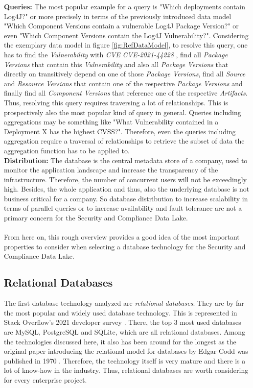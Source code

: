 \textbf{Queries:} The most popular example for a query is "Which deployments contain Log4J?" or more precisely in terms of the previously introduced data model "Which Component Versions contain a vulnerable Log4J Package Version?" or even "Which Component Versions contain the Log4J Vulnerability?". Considering the exemplary data model in figure \ref{fig:RefDataModel}, to resolve this query, one has to find the \emph{Vulnerability} with \emph{CVE} \textit{CVE-2021-44228} \cite{Log4jVuln}, find all \emph{Package Versions} that contain this \emph{Vulnerability} and also all \emph{Package Versions} that directly on transitively depend on one of those \emph{Package Versions}, find all \emph{Source} and \emph{Resource Versions} that contain one of the respective \emph{Package Versions} and finally find all \emph{Component Versions} that reference one of the respective \emph{Artifacts}. Thus, resolving this query requires traversing a lot of relationships. This is prospectively also the most popular kind of query in general. Queries including aggregations may be something like "What Vulnerability contained in a Deployment X has the highest CVSS?". Therefore, even the queries including aggregation require a traversal of relationships to retrieve the subset of data the aggregation function has to be applied to.\\
\textbf{Distribution:} The database is the central metadata store of a company, used to monitor the application landscape and increase the transparency of the infrastructure. Therefore, the number of concurrent users will not be exceedingly high. Besides, the whole application and thus, also the underlying database is not business critical for a company. So database distribution to increase scalability in terms of parallel queries or to increase availability and fault tolerance are not a primary concern for the Security and Compliance Data Lake.\\\\
From here on, this rough overview provides a good idea of the most important properties to consider when selecting a database technology for the Security and Compliance Data Lake. 



\subsection{Relational Databases}
The first database technology analyzed are \textit{relational databases}. They are by far the most popular and widely used database technology. This is represented in Stack Overflow's 2021 developer survey \cite{StackoverflowDeveloperSurvey}. There, the top 3 most used databases are MySQL, PostgreSQL and SQLite, which are all relational databases. Among the technologies discussed here, it also has been around for the longest as the original paper introducing the relational model for databases by Edgar Codd was published in 1970 \cite{RelationalDatabaseOriginalPaper}. Therefore, the technology itself is very mature and there is a lot of know-how in the industry. Thus, relational databases are worth considering for every enterprise project.

